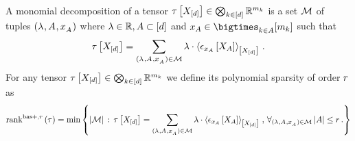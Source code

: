 \begin{definition}
    \label{def:polynomialSparsity}
    A monomial decomposition of a tensor $ \tau\left[X_{[d]}\right]\in\bigotimes_{k\in[d]} \mathbb{R}^{m_{k}}$ is a set $\mathcal{M}$ of tuples $(\lambda^{}, A^{}, x_{A^{}}^{})$ where $\lambda\in\mathbb{R}, A\subset[d]$ and $\catindexof{\variableset}\in\bigtimes_{\atomenumerator\in\variableset} [\catdimof{\atomenumerator}]$ such that
    \begin{align}
        \label{eq:decIntoMonomials}
        \tau\left[X_{[d]}\right]
        = \sum_{(\lambda^{}, A^{}, x_{A^{}}^{})\in\mathcal{M}} \lambda \cdot \left\langle \epsilon_{x_{A}}\left[X_{A}\right]\right\rangle_{\left[ X_{[d]} \right]} \, .
    \end{align}
    For any tensor $ \tau\left[X_{[d]}\right]\in\bigotimes_{k\in[d]} \mathbb{R}^{m_{k}}$ we define its polynomial sparsity of order $r$ as
    \begin{align*}
        \mathrm{rank}^{\mathrm{bas+},r}\left(\tau\right) =
        \min \left\{ \left|\mathcal{M}\right| \,:\,
        \tau\left[X_{[d]}\right] = \sum_{(\lambda^{}, A^{}, x_{A^{}}^{})\in\mathcal{M}} \lambda \cdot \left\langle \epsilon_{x_{A}}\left[X_{A}\right]\right\rangle_{\left[ X_{[d]} \right]} \, , \, \forall_{(\lambda^{}, A^{}, x_{A^{}}^{})\in\mathcal{M}} \left|A\right| \leq r \, .
        \right\}
    \end{align*}
\end{definition}


